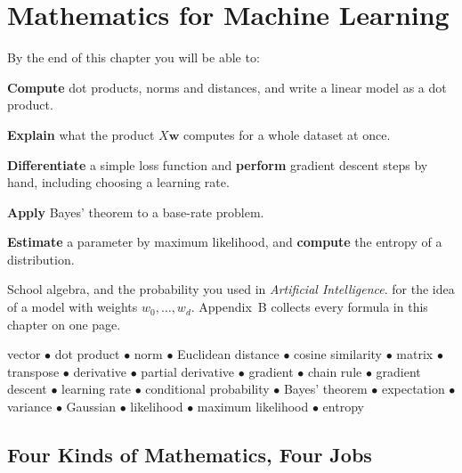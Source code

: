 \chapter{Mathematics for Machine Learning}\label{ch:math}

\begin{outcomes}
By the end of this chapter you will be able to:
\begin{tight}
  \item \textbf{Compute} dot products, norms and distances, and write a linear
        model as a dot product.
  \item \textbf{Explain} what the product $X\mathbf{w}$ computes for a whole
        dataset at once.
  \item \textbf{Differentiate} a simple loss function and \textbf{perform}
        gradient descent steps by hand, including choosing a learning rate.
  \item \textbf{Apply} Bayes' theorem to a base-rate problem.
  \item \textbf{Estimate} a parameter by maximum likelihood, and \textbf{compute}
        the entropy of a distribution.
\end{tight}
\end{outcomes}

\begin{prereq}
School algebra, and the probability you used in \emph{Artificial Intelligence}.
 for the idea of a model with weights $w_0, \dots, w_d$.
Appendix~B collects every formula in this chapter on one page.
\end{prereq}

\begin{keyterms}
vector $\bullet$ dot product $\bullet$ norm $\bullet$ Euclidean distance
$\bullet$ cosine similarity $\bullet$ matrix $\bullet$ transpose $\bullet$
derivative $\bullet$ partial derivative $\bullet$ gradient $\bullet$ chain rule
$\bullet$ gradient descent $\bullet$ learning rate $\bullet$ conditional
probability $\bullet$ Bayes' theorem $\bullet$ expectation $\bullet$ variance
$\bullet$ Gaussian $\bullet$ likelihood $\bullet$ maximum likelihood $\bullet$
entropy
\end{keyterms}

\section{Four Kinds of Mathematics, Four Jobs}

